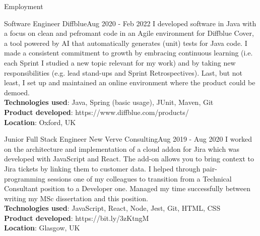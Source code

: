 \documentclass[]{mcdowellcv}
\begin{document}
\begin{cvsection}{Employment}
   	    \begin{cvsubsection}{Software Engineer }{Diffblue}{Aug 2020 - Feb 2022 }
			\hspace{\parindent} \hspace{\parindent} \hspace{\parindent} \hspace{\parindent} I developed software in Java with a focus on clean and pefromant code in an Agile environment for Diffblue Cover, a tool powered by AI that automatically generates (unit) tests for Java code. I made a consistent commitment to growth by embracing continuous learning (i.e. each Sprint I studied a new topic relevant for my work) and by taking new responsibilities (e.g. lead stand-ups and Sprint Retrospectives). Last, but not least, I set up and maintained an online environment where the product could be demoed.
      		\\ \textbf{Technologies used}: Java, Spring (basic usage), JUnit, Maven, Git
	  		\\ \textbf{Product developed}: https://www.diffblue.com/products/
			  \\ \textbf{Location}: Oxford, UK
		\end{cvsubsection}

		\begin{cvsubsection}{Junior Full Stack Engineer }{New Verve Consulting}{Aug 2019 - Aug 2020} 
			\hspace{\parindent} \hspace{\parindent} \hspace{\parindent} \hspace{\parindent} I worked on the architecture and implementation of a cloud addon for Jira which was developed with JavaScript and React. The add-on allows you to bring context to Jira tickets by linking them to customer data. I helped through pair-programming sessions one of my colleagues to transition from a Technical Consultant position to a Developer one. Managed my time successfully between writing my MSc dissertation and this position.
      		\\ \textbf{Technologies used}: JavaScript, React, Node, Jest, Git, HTML, CSS
	  		\\ \textbf{Product developed}: https://bit.ly/3zKtngM
			\\ \textbf{Location}: Glasgow, UK
		\end{cvsubsection}



\end{cvsection}
\end{document}
